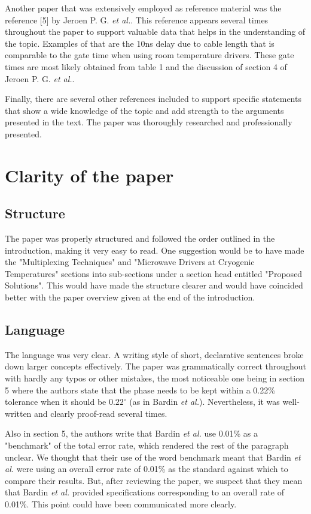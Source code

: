 \documentclass[11pt]{article}
\begin{document}
Another paper that was extensively employed as reference material was the
reference [5] by Jeroen P. G. \emph{et al.}. This reference appears several
times throughout the paper to support valuable data that helps in the
understanding of the topic. Examples of that are the 10ns delay due to cable
length that is comparable to the gate time when using room temperature drivers.
These gate times are most likely obtained from table 1 and the discussion of
section 4 of Jeroen P. G. \emph{et al.}.

Finally, there are several other references included to support specific
statements that show a wide knowledge of the topic and add strength to the
arguments presented in the text. The paper was thoroughly researched and
professionally presented.


\section{Clarity of the paper}

\subsection{Structure}

The paper was properly structured and followed the order outlined in
the introduction, making it very easy to read. One suggestion would be
to have made the "Multiplexing Techniques" and "Microwave Drivers at
Cryogenic Temperatures" sections into sub-sections under a section
head entitled "Proposed Solutions". This would have made the structure
clearer and would have coincided better with the paper overview given
at the end of the introduction.

\subsection{Language}

The language was very clear. A writing style of short, declarative sentences
broke down larger concepts effectively. The paper was grammatically correct
throughout with hardly any typos or other mistakes, the most noticeable one
being in section 5 where the authors state that the phase needs to be kept
within a 0.22\% tolerance when it should be $0.22^\circ$ (as in Bardin \emph{et
  al.}). Nevertheless, it was well-written and clearly proof-read several times.

Also in section 5, the authors write that Bardin \emph{et al.} use 0.01\% as a
"benchmark" of the total error rate, which rendered the rest of the paragraph
unclear. We thought that their use of the word benchmark meant that Bardin
\emph{et al.} were using an overall error rate of 0.01\% as the standard against
which to compare their results. But, after reviewing the paper, we suspect that
they mean that Bardin \emph{et al.} provided specifications corresponding to an
overall rate of 0.01\%. This point could have been communicated more clearly.
\end{document}
